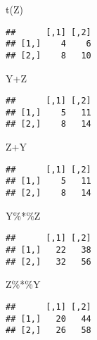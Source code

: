 \documentclass[
]{article}
\newenvironment{Shaded}{\begin{snugshade}}{\end{snugshade}}
\newcommand{\FunctionTok}[1]{\textcolor[rgb]{0.00,0.00,0.00}{#1}}
\newcommand{\NormalTok}[1]{#1}
\newcommand{\SpecialCharTok}[1]{\textcolor[rgb]{0.00,0.00,0.00}{#1}}
\begin{document}
\begin{Shaded}
\begin{Highlighting}[]
\FunctionTok{t}\NormalTok{(Z)}
\end{Highlighting}
\end{Shaded}

\begin{verbatim}
##      [,1] [,2]
## [1,]    4    6
## [2,]    8   10
\end{verbatim}

\begin{Shaded}
\begin{Highlighting}[]
\NormalTok{Y}\SpecialCharTok{+}\NormalTok{Z}
\end{Highlighting}
\end{Shaded}

\begin{verbatim}
##      [,1] [,2]
## [1,]    5   11
## [2,]    8   14
\end{verbatim}

\begin{Shaded}
\begin{Highlighting}[]
\NormalTok{Z}\SpecialCharTok{+}\NormalTok{Y}
\end{Highlighting}
\end{Shaded}

\begin{verbatim}
##      [,1] [,2]
## [1,]    5   11
## [2,]    8   14
\end{verbatim}

\begin{Shaded}
\begin{Highlighting}[]
\NormalTok{Y}\SpecialCharTok{\%*\%}\NormalTok{Z}
\end{Highlighting}
\end{Shaded}

\begin{verbatim}
##      [,1] [,2]
## [1,]   22   38
## [2,]   32   56
\end{verbatim}

\begin{Shaded}
\begin{Highlighting}[]
\NormalTok{Z}\SpecialCharTok{\%*\%}\NormalTok{Y}
\end{Highlighting}
\end{Shaded}

\begin{verbatim}
##      [,1] [,2]
## [1,]   20   44
## [2,]   26   58
\end{verbatim}
\end{document}
